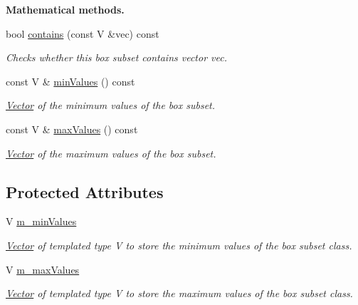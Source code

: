 \begin{Indent}{\bf Mathematical methods.}\par
\begin{DoxyCompactItemize}
\item 
bool \hyperlink{class_q_u_e_s_o_1_1_box_subset_a16fff2b1f133ddd750008680c6831dd0}{contains} (const V \&vec) const 
\begin{DoxyCompactList}\small\item\em Checks whether this box subset contains vector {\ttfamily vec}. \end{DoxyCompactList}\item 
const V \& \hyperlink{class_q_u_e_s_o_1_1_box_subset_a57d3ba7df60a38abc4c161ff78f4a567}{min\-Values} () const 
\begin{DoxyCompactList}\small\item\em \hyperlink{class_q_u_e_s_o_1_1_vector}{Vector} of the minimum values of the box subset. \end{DoxyCompactList}\item 
const V \& \hyperlink{class_q_u_e_s_o_1_1_box_subset_a47616371623019a8c6399d5b3661d25b}{max\-Values} () const 
\begin{DoxyCompactList}\small\item\em \hyperlink{class_q_u_e_s_o_1_1_vector}{Vector} of the maximum values of the box subset. \end{DoxyCompactList}\end{DoxyCompactItemize}
\end{Indent}
\subsection*{Protected Attributes}
\begin{DoxyCompactItemize}
\item 
V \hyperlink{class_q_u_e_s_o_1_1_box_subset_a633a4fbfa03590b38e4d2b192f3cc2b5}{m\-\_\-min\-Values}
\begin{DoxyCompactList}\small\item\em \hyperlink{class_q_u_e_s_o_1_1_vector}{Vector} of templated type {\ttfamily V} to store the minimum values of the box subset class. \end{DoxyCompactList}\item 
V \hyperlink{class_q_u_e_s_o_1_1_box_subset_ad234b8d38a236fb5c0d1353302c3e2f5}{m\-\_\-max\-Values}
\begin{DoxyCompactList}\small\item\em \hyperlink{class_q_u_e_s_o_1_1_vector}{Vector} of templated type {\ttfamily V} to store the maximum values of the box subset class. \end{DoxyCompactList}\end{DoxyCompactItemize}


